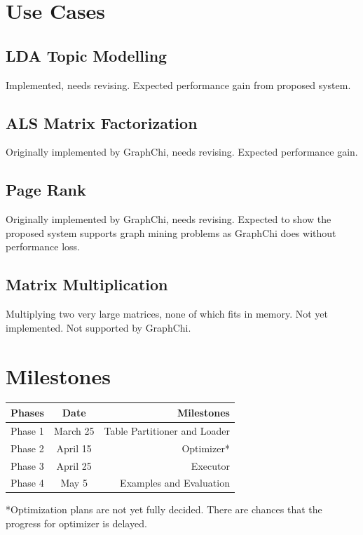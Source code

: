 \documentclass[10pt, twocolumn, a4paper]{article}
\begin{document}
\section{Use Cases}
\label{sec:usecases}
\subsection{LDA Topic Modelling}
Implemented, needs revising. Expected performance gain from proposed system.

\subsection{ALS Matrix Factorization}
Originally implemented by GraphChi, needs revising. Expected performance gain.

\subsection{Page Rank}
Originally implemented by GraphChi, needs revising. Expected to show the proposed system supports graph mining problems as GraphChi does without performance loss.

\subsection{Matrix Multiplication}
Multiplying two very large matrices, none of which fits in memory. Not yet implemented. Not supported by GraphChi.

\section{Milestones}
\label{sec:milestones}
\begin{tabular}{|l | c | r |}
\hline
Phases & Date & Milestones\\
\hline
Phase 1 & March 25 & Table Partitioner and Loader \\
\hline
Phase 2 & April 15 & Optimizer* \\
\hline
Phase 3 & April 25 & Executor \\
\hline
Phase 4 & May 5 & Examples and Evaluation \\
\hline
\end{tabular}

*Optimization plans are not yet fully decided. There are chances that the progress for optimizer is delayed.
\end{document}
